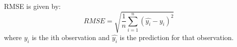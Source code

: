 RMSE is given by:$$
{RMSE =\sqrt{\frac{1}{n}\sum_{i=1}^n (\hat{y_i}-y_i)^2}}
$$where $y_i$ is the ith observation and $\hat{y_i}$ is the prediction for that observation. 





















